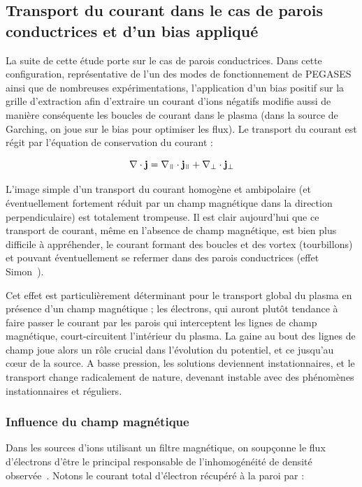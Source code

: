 \begin{refsection}
\subsection{Transport du courant dans le cas de parois conductrices et d'un bias
appliqué}

La suite de cette étude porte sur le cas de parois
conductrices. Dans cette configuration, représentative de
l'un des modes de fonctionnement de PEGASES ainsi que de nombreuses
expérimentations, l'application d'un bias positif sur la grille d'extraction afin d'extraire un
courant d'ions négatifs modifie aussi de manière conséquente les boucles de
courant dans le plasma (dans la source de Garching, on joue sur le bias pour
optimiser les flux). Le transport du courant est régit par l'équation de
conservation du courant :

\begin{equation}
\nabla\cdot\mathbf j=\nabla_\para\cdot \mathbf j_\para +\nabla_\perp\cdot
\mathbf j_\perp
\end{equation}

L'image simple d'un transport du courant homogène et
ambipolaire (et éventuellement fortement réduit par un champ magnétique dans la
direction perpendiculaire) est totalement trompeuse. Il est clair aujourd'hui
que ce transport de courant, même en l'absence de champ magnétique, est bien plus difficile à appréhender, le
courant formant des boucles et des vortex (tourbillons) et pouvant
éventuellement se refermer dans des parois conductrices (effet Simon~\parencite{Simon55}).

Cet effet est particulièrement déterminant pour le transport global du
plasma en présence d'un champ magnétique ; les électrons, qui auront plutôt
tendance à faire passer le courant par les parois qui
interceptent les lignes de champ magnétique, court-circuitent l'intérieur du
plasma. La gaine au bout des lignes de champ joue alors un rôle crucial dans
l'évolution du potentiel, et ce jusqu'au c\oe{}ur de la source. A basse
pression, les solutions deviennent instationnaires, et le transport change
radicalement de nature, devenant instable avec des phénomènes instationnaires
et réguliers.
	
\subsubsection{Influence du champ magnétique}
Dans les sources d'ions utilisant un filtre magnétique, on soupçonne le flux
d'électrons d'être le principal responsable de l'inhomogénéité
de densité observée~\parencite{PIC2D,PIC3D}.
Notons le courant total d'électron récupéré à la paroi par :


\end{refsection}
